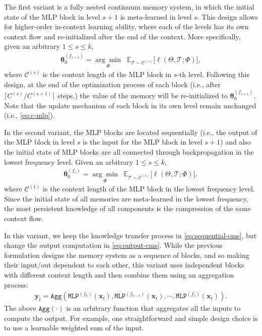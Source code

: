 \documentclass{article}
\newcommand{\head}[1]{\vspace{1.7mm}\noindent{{\textcolor{c4}{\bf #1.}}}}
\newcommand{\vx}{\boldsymbol{x}}
\newcommand{\vy}{\boldsymbol{y}}
\begin{document}
{\head{Nested Continuum Memory Systems}
The first variant is a fully nested continuum memory system, in which the initial state of the MLP block in level $s+1$ is meta-learned in level $s$. This design allows for higher-order in-context learning ability, where each of the levels has its own context flow and re-initialized after the end of the context. More specifically, given an arbitrary $1 \leq s \leq k$, 
\begin{align}
    \boldsymbol{\theta}^{(f_{s+1})}_0 =
\underset{\Phi}{\arg\min}
\;\;
\mathbb{E}_{\mathcal{T} \sim \mathcal{C}^{(s)}}
\Biggl[
    \ell(\Theta, \mathcal{T}; \Phi)
\Biggr],
\end{align}
where $\mathcal{C}^{(s)}$ is the context length of the MLP block in $s$-th level. Following this design, at the end of the optimization process of each block (i.e., after $\lceil C^{(s)}/C^{(s+1)} \rceil$ steps.) the value of the memory will be re-initialized to $ \boldsymbol{\theta}^{(f_{s+1})}_0$. Note that the update mechanism of each block in its own level remain unchanged (i.e., \autoref{eq:c-mlp}).

\head{Sequential Continuum Memory Systems} 
In the second variant, the MLP blocks are located sequentially (i.e., the output of the MLP block in level $s$ is the input for the MLP block in level $s+1$) and also the initial state of MLP blocks are all connected through backpropagation in the lowest frequency level. Given an arbitrary $1 \leq s \leq k$, 
\begin{align}\label{eq:sequential-cms}
    \boldsymbol{\theta}^{(f_{s})}_0 =
\underset{\Phi}{\arg\min}
\;\;
\mathbb{E}_{\mathcal{T} \sim \mathcal{C}^{(1)}}
\Biggl[
    \ell(\Theta, \mathcal{T}; \Phi)
\Biggr],
\end{align}
where $\mathcal{C}^{(1)}$ is the context length of the MLP block in the lowest frequency level. Since the initial state of all memories are meta-learned in the lowest frequency, the most persistent knowledge of all components is the compression of the same context flow. 

\head{Independent (Head-wise) Continuum Memory Systems}
In this variant, we keep the knowledge transfer process in \autoref{eq:sequential-cms}, but change the output computation in \autoref{eq:output-cms}. While the previous formulation designs the memory system as a sequence of blocks, and so making their input/out dependent to each other, this variant uses independent blocks with different context length and then combine them using an aggregation process:
\begin{align}\label{eq:independent-variant}
    \vy_t = \texttt{Agg} \left(\texttt{MLP}^{(f_k)}(\vx_t), \texttt{MLP}^{(f_{k-1})}(\vx_t), \cdots, \texttt{MLP}^{(f_1)}(\vx_t) \right).
\end{align}
The above $\texttt{Agg} \left(\cdot\right)$ is an arbitrary function that aggregates all the inputs to compute the output. For example, one straightforward and simple design choice is to use a learnable weighted sum of the input. 

}
\end{document}
